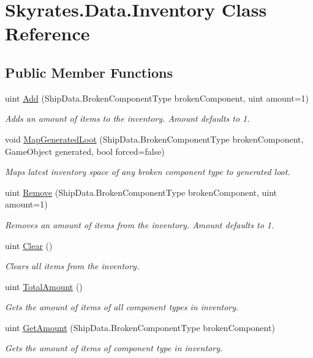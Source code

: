 \hypertarget{class_skyrates_1_1_data_1_1_inventory}{\section{Skyrates.\-Data.\-Inventory Class Reference}
\label{class_skyrates_1_1_data_1_1_inventory}
}
\subsection*{Public Member Functions}
\begin{DoxyCompactItemize}
\item 
uint \hyperlink{class_skyrates_1_1_data_1_1_inventory_a3ea3dd732958623226e1656b58d92163}{Add} (Ship\-Data.\-Broken\-Component\-Type broken\-Component, uint amount=1)
\begin{DoxyCompactList}\small\item\em Adds an amount of items to the inventory. Amount defaults to 1. \end{DoxyCompactList}\item 
void \hyperlink{class_skyrates_1_1_data_1_1_inventory_a176fee69b6de0e780897b03b14c16077}{Map\-Generated\-Loot} (Ship\-Data.\-Broken\-Component\-Type broken\-Component, Game\-Object generated, bool forced=false)
\begin{DoxyCompactList}\small\item\em Maps latest inventory space of any broken component type to generated loot. \end{DoxyCompactList}\item 
uint \hyperlink{class_skyrates_1_1_data_1_1_inventory_a582a1d5a0bf20c92683728dd43625f73}{Remove} (Ship\-Data.\-Broken\-Component\-Type broken\-Component, uint amount=1)
\begin{DoxyCompactList}\small\item\em Removes an amount of items from the inventory. Amount defaults to 1. \end{DoxyCompactList}\item 
uint \hyperlink{class_skyrates_1_1_data_1_1_inventory_a15ea547b85de45f35cad6b4c479d7db7}{Clear} ()
\begin{DoxyCompactList}\small\item\em Clears all items from the inventory. \end{DoxyCompactList}\item 
uint \hyperlink{class_skyrates_1_1_data_1_1_inventory_a131a1ad7d12bb6ef1f4fe8a4a74d5327}{Total\-Amount} ()
\begin{DoxyCompactList}\small\item\em Gets the amount of items of all component types in inventory. \end{DoxyCompactList}\item 
uint \hyperlink{class_skyrates_1_1_data_1_1_inventory_aa3e33ad951806fa9c70c72ed94ac63f2}{Get\-Amount} (Ship\-Data.\-Broken\-Component\-Type broken\-Component)
\begin{DoxyCompactList}\small\item\em Gets the amount of items of component type in inventory. \end{DoxyCompactList}\end{DoxyCompactItemize}
